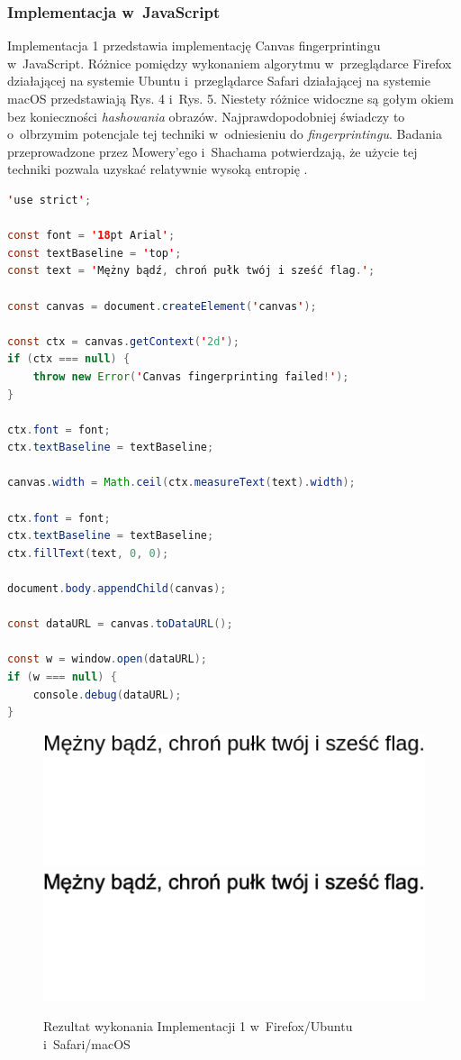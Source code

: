 \subsubsection{Implementacja w~JavaScript}
Implementacja 1 przedstawia implementację Canvas fingerprintingu w~JavaScript.
Różnice pomiędzy wykonaniem algorytmu w~przeglądarce Firefox działającej na
systemie Ubuntu i~przeglądarce Safari działającej na systemie macOS
przedstawiają Rys. 4 i~Rys. 5. Niestety różnice widoczne są gołym okiem bez
konieczności \emph{hashowania} obrazów. Najprawdopodobniej świadczy to
o~olbrzymim potencjale tej techniki w~odniesieniu do \emph{fingerprintingu}.
Badania przeprowadzone przez Mowery'ego i~Shachama potwierdzają, że użycie tej
techniki pozwala uzyskać relatywnie wysoką entropię \cite{mowery2012pixel}.

\begin{lstlisting}[float,language=Java,caption=Podstawowy Canvas fingerprinting w~JavaScript]
'use strict';

const font = '18pt Arial';
const textBaseline = 'top';
const text = 'Mężny bądź, chroń pułk twój i sześć flag.';

const canvas = document.createElement('canvas');

const ctx = canvas.getContext('2d');
if (ctx === null) {
    throw new Error('Canvas fingerprinting failed!');
}

ctx.font = font;
ctx.textBaseline = textBaseline;

canvas.width = Math.ceil(ctx.measureText(text).width);

ctx.font = font;
ctx.textBaseline = textBaseline;
ctx.fillText(text, 0, 0);

document.body.appendChild(canvas);

const dataURL = canvas.toDataURL();

const w = window.open(dataURL);
if (w === null) {
    console.debug(dataURL);
}
\end{lstlisting}

\begin{figure}
	\includegraphics[trim={0 121px 218px 0},clip,frame]{img/04}
	\includegraphics[trim={0 121px 218px 0},clip,frame]{img/05}
	\caption{Rezultat wykonania Implementacji 1 w~Firefox/Ubuntu i~Safari/macOS}
\end{figure}

